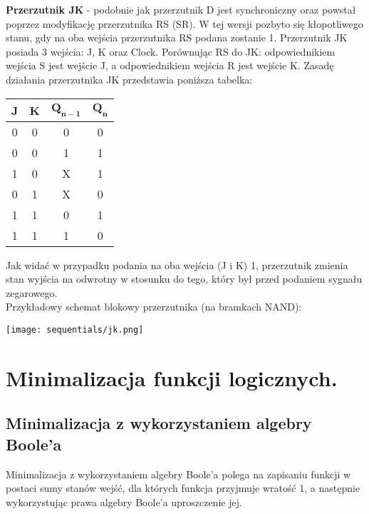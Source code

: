 \documentclass[main.tex]{subfiles}
\begin{document}
    \begin{definition}
        \textbf{Przerzutnik JK} - podobnie jak przerzutnik D jest synchroniczny oraz powstał poprzez modyfikację przerzutnika RS (SR). W tej wersji pozbyto się kłopotliwego stanu, gdy na oba wejścia przerzutnika RS podana zostanie 1.
        Przerzutnik JK posiada 3 wejścia: J, K oraz Clock. Porównując RS do JK: odpowiednikiem wejścia S jest wejście J, a odpowiednikiem wejścia R jest wejście K.
        Zasadę działania przerzutnika JK przedstawia poniższa tabelka:
        \begin{table}[H]
            \center
            \begin{tabular}{|c|c|c|c|}
                \hline
                \textbf{J} & \textbf{K} & $\mathbf{Q_{n-1}}$ & $\mathbf{Q_n}$ \\ \hline
                0 & 0 & 0 & 0              \\ \hline
                0 & 0 & 1 & 1              \\ \hline
                1 & 0 & X & 1              \\ \hline
                0 & 1 & X & 0              \\ \hline
                1 & 1 & 0 & 1              \\ \hline
                1 & 1 & 1 & 0              \\ \hline
            \end{tabular}
        \end{table}
        Jak widać w przypadku podania na oba wejścia (J i K) 1, przerzutnik zmienia stan wyjścia na odwrotny w stosunku do tego, który był przed podaniem sygnału zegarowego. \\
        \noindent Przykładowy schemat blokowy przerzutnika (na bramkach NAND): \\

        \begin{center}
            \texttt{[image: sequentials/jk.png]}
        \end{center}

    \end{definition}

    \newpage

    \section{Minimalizacja funkcji logicznych.}

    \subsection{Minimalizacja z wykorzystaniem algebry Boole'a}
    \begin{definition}
        Minimalizacja z wykorzystaniem algebry Boole'a polega na zapisaniu funkcji w postaci sumy stanów wejść, dla których funkcja przyjmuje wratość 1, a następnie wykorzystując prawa algebry Boole'a uproszczenie jej.
    \end{definition}
\end{document}
